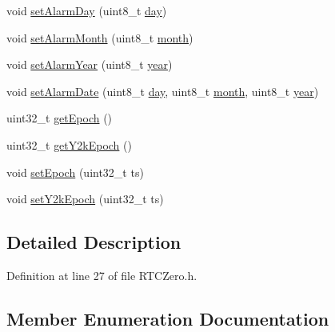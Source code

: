 \begin{DoxyCompactItemize}
\item 
void \hyperlink{class_r_t_c_zero_a4519ba0e3eee8a3bf03f7c14b3ffa902}{set\+Alarm\+Day} (uint8\+\_\+t \hyperlink{_time_8cpp_a51dcd9f072551ba8f47449a4e7f78c29}{day})
\item 
void \hyperlink{class_r_t_c_zero_a8fe74d0c1ec7922f893addd67dc16aba}{set\+Alarm\+Month} (uint8\+\_\+t \hyperlink{_time_8cpp_a726c707dded9d78cf076554eceb956ec}{month})
\item 
void \hyperlink{class_r_t_c_zero_ae55ef909edbb893eba4becc8676dd8d6}{set\+Alarm\+Year} (uint8\+\_\+t \hyperlink{_time_8cpp_a8608865f8292c0505e02b67fd1cf39e8}{year})
\item 
void \hyperlink{class_r_t_c_zero_a12727934884612e1a125e6be3f461058}{set\+Alarm\+Date} (uint8\+\_\+t \hyperlink{_time_8cpp_a51dcd9f072551ba8f47449a4e7f78c29}{day}, uint8\+\_\+t \hyperlink{_time_8cpp_a726c707dded9d78cf076554eceb956ec}{month}, uint8\+\_\+t \hyperlink{_time_8cpp_a8608865f8292c0505e02b67fd1cf39e8}{year})
\item 
uint32\+\_\+t \hyperlink{class_r_t_c_zero_aefda208cc548613b8af437ba6e7d1ff3}{get\+Epoch} ()
\item 
uint32\+\_\+t \hyperlink{class_r_t_c_zero_ae660721e3ba20b6701431d8cd8bed697}{get\+Y2k\+Epoch} ()
\item 
void \hyperlink{class_r_t_c_zero_a5427b2b365b295516944a69b66e506ba}{set\+Epoch} (uint32\+\_\+t ts)
\item 
void \hyperlink{class_r_t_c_zero_aea1cc5a935bacd8430cb3be5a87281aa}{set\+Y2k\+Epoch} (uint32\+\_\+t ts)
\end{DoxyCompactItemize}


\subsection{Detailed Description}


Definition at line 27 of file R\+T\+C\+Zero.\+h.



\subsection{Member Enumeration Documentation}
